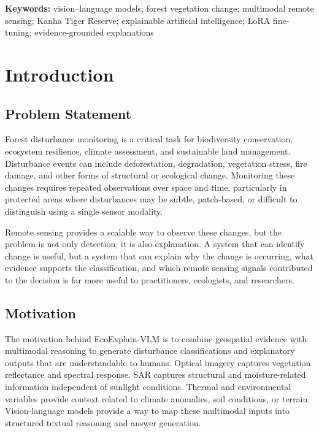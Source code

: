 \documentclass[11pt]{article}
\begin{document}
\vspace{0.5em}
\noindent\textbf{Keywords:} vision--language models; forest vegetation change; multimodal remote sensing; Kanha Tiger Reserve; explainable artificial intelligence; LoRA fine-tuning; evidence-grounded explanations

\tableofcontents
\listoftables
\listoffigures

\section{Introduction}

\subsection{Problem Statement}
Forest disturbance monitoring is a critical task for biodiversity conservation, ecosystem resilience, climate assessment, and sustainable land management. Disturbance events can include deforestation, degradation, vegetation stress, fire damage, and other forms of structural or ecological change. Monitoring these changes requires repeated observations over space and time, particularly in protected areas where disturbances may be subtle, patch-based, or difficult to distinguish using a single sensor modality.

Remote sensing provides a scalable way to observe these changes, but the problem is not only detection; it is also explanation. A system that can identify change is useful, but a system that can explain why the change is occurring, what evidence supports the classification, and which remote sensing signals contributed to the decision is far more useful to practitioners, ecologists, and researchers.

\subsection{Motivation}
The motivation behind EcoExplain-VLM is to combine geospatial evidence with multimodal reasoning to generate disturbance classifications and explanatory outputs that are understandable to humans. Optical imagery captures vegetation reflectance and spectral response. SAR captures structural and moisture-related information independent of sunlight conditions. Thermal and environmental variables provide context related to climate anomalies, soil conditions, or terrain. Vision-language models provide a way to map these multimodal inputs into structured textual reasoning and answer generation.
\end{document}
